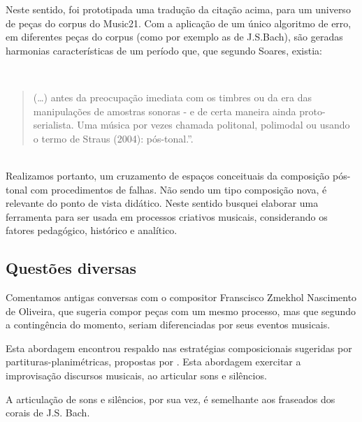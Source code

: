 Neste sentido, foi prototipada uma tradução da citação acima, para um universo de peças do corpus do Music21. Com a aplicação de um único algoritmo de erro, em diferentes peças do corpus (como por exemplo as de J.S.Bach), são geradas harmonias características de um período que, que segundo Soares, existia:

\ \\
\begin{quote}
(\ldots) antes da preocupação imediata com os timbres ou da era das manipulações de amostras sonoras - e de certa maneira ainda proto-serialista. Uma música por vezes chamada politonal, polimodal ou usando o termo de Straus (2004): pós-tonal.''.\cite[p.~18]{soares_luteria_2015}
\end{quote}
\ \\

Realizamos portanto, um cruzamento de espaços conceituais da composição pós-tonal com procedimentos de falhas. Não sendo um tipo composição nova, é relevante do ponto de vista didático. Neste sentido busquei elaborar uma ferramenta para ser usada em processos criativos musicais, considerando os fatores pedagógico, histórico e analítico.

\subsection*{Questões diversas}

Comentamos  antigas conversas com o compositor Franscisco Zmekhol Nascimento de Oliveira, que sugeria compor peças com um mesmo processo, mas que segundo a contingência do momento, seriam diferenciadas por seus eventos musicais. 

Esta abordagem encontrou respaldo nas estratégias composicionais sugeridas por partituras-planimétricas, propostas por \cite{koellreutter_introducao_1987}. Esta abordagem exercitar a improvisação discursos musicais, ao articular sons e silêncios. 

A articulação de sons e silêncios, por sua vez, é semelhante aos fraseados dos corais de J.S. Bach.


